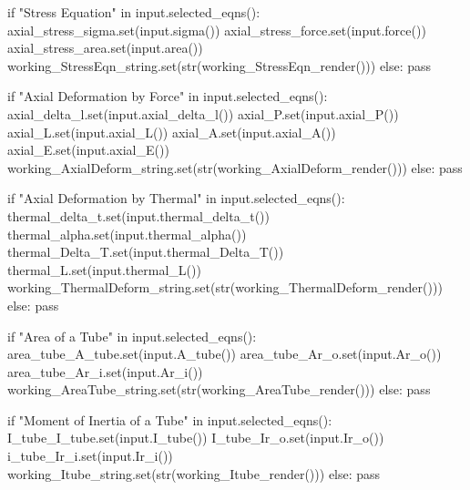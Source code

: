 \documentclass[
  letterpaper,
  DIV=11,
  numbers=noendperiod]{scrreprt}
\newenvironment{Shaded}{\begin{snugshade}}{\end{snugshade}}
\newcommand{\NormalTok}[1]{\textcolor[rgb]{0.00,0.23,0.31}{#1}}
\begin{document}
\begin{Shaded}
\begin{Highlighting}[]
\NormalTok{            if "Stress Equation" in input.selected\_eqns(): }
\NormalTok{                axial\_stress\_sigma.set(input.sigma())}
\NormalTok{                axial\_stress\_force.set(input.force())}
\NormalTok{                axial\_stress\_area.set(input.area())}
\NormalTok{                working\_StressEqn\_string.set(str(working\_StressEqn\_render()))}
\NormalTok{            else:}
\NormalTok{                 pass}
            
\NormalTok{            if "Axial Deformation by Force" in input.selected\_eqns(): }
\NormalTok{                axial\_delta\_l.set(input.axial\_delta\_l())}
\NormalTok{                axial\_P.set(input.axial\_P())}
\NormalTok{                axial\_L.set(input.axial\_L())}
\NormalTok{                axial\_A.set(input.axial\_A())}
\NormalTok{                axial\_E.set(input.axial\_E())}
\NormalTok{                working\_AxialDeform\_string.set(str(working\_AxialDeform\_render()))}
\NormalTok{            else:}
\NormalTok{                 pass}
            
\NormalTok{            if "Axial Deformation by Thermal" in input.selected\_eqns(): }
\NormalTok{                thermal\_delta\_t.set(input.thermal\_delta\_t())}
\NormalTok{                thermal\_alpha.set(input.thermal\_alpha())}
\NormalTok{                thermal\_Delta\_T.set(input.thermal\_Delta\_T())}
\NormalTok{                thermal\_L.set(input.thermal\_L())}
\NormalTok{                working\_ThermalDeform\_string.set(str(working\_ThermalDeform\_render()))}
\NormalTok{            else:}
\NormalTok{                 pass}
    
\NormalTok{            if "Area of a Tube" in input.selected\_eqns(): }
\NormalTok{                area\_tube\_A\_tube.set(input.A\_tube())}
\NormalTok{                area\_tube\_Ar\_o.set(input.Ar\_o())}
\NormalTok{                area\_tube\_Ar\_i.set(input.Ar\_i())}
\NormalTok{                working\_AreaTube\_string.set(str(working\_AreaTube\_render()))}
\NormalTok{            else:}
\NormalTok{                 pass}
    
\NormalTok{            if "Moment of Inertia of a Tube" in input.selected\_eqns():           }
\NormalTok{                I\_tube\_I\_tube.set(input.I\_tube())}
\NormalTok{                I\_tube\_Ir\_o.set(input.Ir\_o())}
\NormalTok{                i\_tube\_Ir\_i.set(input.Ir\_i())}
\NormalTok{                working\_Itube\_string.set(str(working\_Itube\_render()))}
\NormalTok{            else:}
\NormalTok{                 pass}
    

\end{Highlighting}
\end{Shaded}
\end{document}
